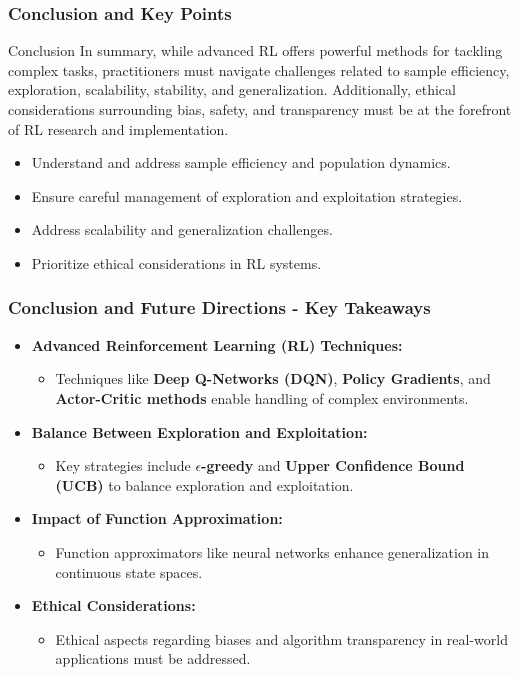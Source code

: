 \documentclass{beamer}
\begin{document}
\begin{frame}[fragile]
    \frametitle{Conclusion and Key Points}
    \begin{block}{Conclusion}
        In summary, while advanced RL offers powerful methods for tackling complex tasks, practitioners must navigate challenges related to sample efficiency, exploration, scalability, stability, and generalization. Additionally, ethical considerations surrounding bias, safety, and transparency must be at the forefront of RL research and implementation.
    \end{block}
    
    \begin{itemize}
        \item Understand and address sample efficiency and population dynamics.
        \item Ensure careful management of exploration and exploitation strategies.
        \item Address scalability and generalization challenges.
        \item Prioritize ethical considerations in RL systems.
    \end{itemize}
\end{frame}

\begin{frame}[fragile]
    \frametitle{Conclusion and Future Directions - Key Takeaways}
    \begin{itemize}
        \item \textbf{Advanced Reinforcement Learning (RL) Techniques:}
        \begin{itemize}
            \item Techniques like \textbf{Deep Q-Networks (DQN)}, \textbf{Policy Gradients}, and \textbf{Actor-Critic methods} enable handling of complex environments.
        \end{itemize}
        
        \item \textbf{Balance Between Exploration and Exploitation:}
        \begin{itemize}
            \item Key strategies include \textbf{$\epsilon$-greedy} and \textbf{Upper Confidence Bound (UCB)} to balance exploration and exploitation.
        \end{itemize}

        \item \textbf{Impact of Function Approximation:}
        \begin{itemize}
            \item Function approximators like neural networks enhance generalization in continuous state spaces.
        \end{itemize}

        \item \textbf{Ethical Considerations:}
        \begin{itemize}
            \item Ethical aspects regarding biases and algorithm transparency in real-world applications must be addressed.
        \end{itemize}
    \end{itemize}
\end{frame}
\end{document}
